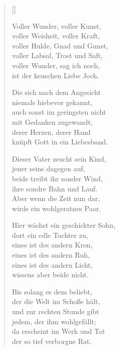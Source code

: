 \begin{multicols}{2}
\settowidth{\versewidth}{Hier wächst ein geschickter Sohn,}
\begin{verse}[\versewidth]

 Voller Wunder, voller Kunst,\\
voller Weisheit, voller Kraft,\\
voller Hulde, Gnad und Gunst,\\
voller Labsal, Trost und Saft,\\
voller Wunder, sag ich noch,\\
ist der keuschen Liebe Joch.

 Die sich nach dem Angesicht\\
niemals hiebevor gekannt,\\
auch sonst im geringsten nicht\\
mit Gedanken zugewandt,\\
derer Herzen, derer Hand\\
knüpft Gott in ein Liebesband.

 Dieser Vater zeucht sein Kind,\\
jener seins dagegen auf,\\
beide treibt ihr sonder Wind,\\
ihre sondre Bahn und Lauf.\\
Aber wenn die Zeit nun dar,\\
wirds ein wohlgeratnes Paar.

 Hier wächst ein geschickter Sohn,\\
dort ein edle Tochter zu,\\
eines ist des andern Kron,\\
eines ist des andern Ruh,\\
eines ist des andern Licht,\\
wissens aber beide nicht.

 Bis solang es dem beliebt,\\
der die Welt im Schoße hält,\\
und zur rechten Stunde gibt\\
jedem, der ihm wohlgefällt;\\
da erscheint im Werk und Tat\\
der so tief verborgne Rat.


\end{verse}
\end{multicols}
